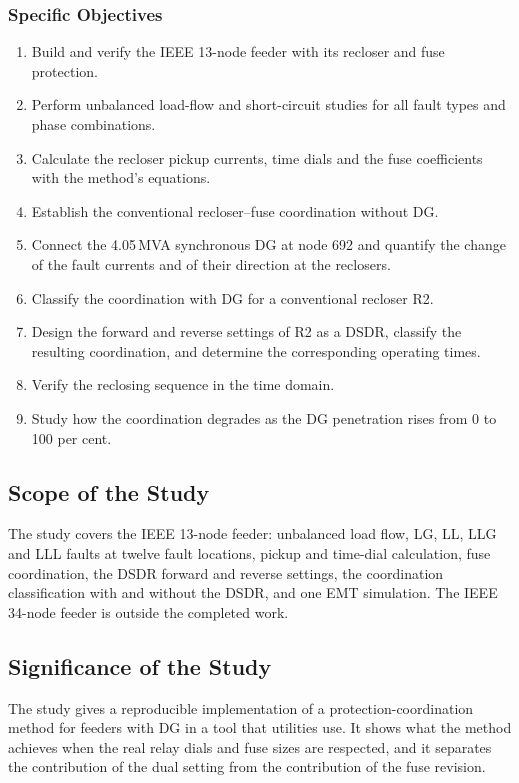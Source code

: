 \documentclass[12pt,a4paper]{article}
\begin{document}
\subsubsection{Specific Objectives}
\begin{enumerate}
\item Build and verify the IEEE 13-node feeder with its recloser and fuse protection.
\item Perform unbalanced load-flow and short-circuit studies for all fault types and phase combinations.
\item Calculate the recloser pickup currents, time dials and the fuse coefficients with the method's equations.
\item Establish the conventional recloser--fuse coordination without DG.
\item Connect the 4.05\,MVA synchronous DG at node 692 and quantify the change of the fault currents and of
      their direction at the reclosers.
\item Classify the coordination with DG for a conventional recloser R2.
\item Design the forward and reverse settings of R2 as a DSDR, classify the resulting coordination, and
      determine the corresponding operating times.
\item Verify the reclosing sequence in the time domain.
\item Study how the coordination degrades as the DG penetration rises from 0 to 100 per cent.
\end{enumerate}

\subsection{Scope of the Study}
The study covers the IEEE 13-node feeder: unbalanced load flow, LG, LL, LLG and LLL faults at twelve fault
locations, pickup and time-dial calculation, fuse coordination, the DSDR forward and reverse settings, the
coordination classification with and without the DSDR, and one EMT simulation. The IEEE 34-node feeder
is outside the completed work.

\subsection{Significance of the Study}
The study gives a reproducible implementation of a protection-coordination method for feeders with DG in a
tool that utilities use. It shows what the method achieves when the real relay dials and fuse sizes are
respected, and it separates the contribution of the dual setting from the contribution of the fuse revision.
\end{document}
